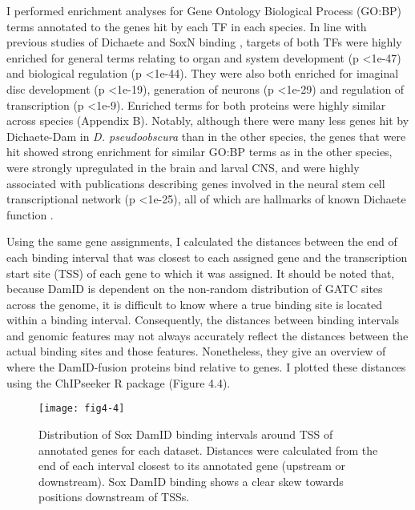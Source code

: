 I performed enrichment analyses for Gene Ontology Biological Process (GO:BP) terms annotated to the genes hit by each TF in each species. In line with previous studies of Dichaete and SoxN binding \citep{aleksic_role_2013,ferrero_soxneuro_2014}, targets of both TFs were highly enriched for general terms relating to organ and system development (p \textless 1e-47) and biological regulation (p \textless 1e-44). They were also both enriched for imaginal disc development (p \textless 1e-19), generation of neurons (p \textless 1e-29) and regulation of transcription (p \textless 1e-9). Enriched terms for both proteins were highly similar across species (Appendix B). Notably, although there were many less genes hit by Dichaete-Dam in \emph{D. pseudoobscura} than in the other species, the genes that were hit showed strong enrichment for similar GO:BP terms as in the other species, were strongly upregulated in the brain and larval CNS, and were highly associated with publications describing genes involved in the neural stem cell transcriptional network (p \textless 1e-25), all of which are hallmarks of known Dichaete function \citep{aleksic_role_2013,shen_identifying_2013,soriano_drosophila_1998}.

Using the same gene assignments, I calculated the distances between the end of each binding interval that was closest to each assigned gene and the transcription start site (TSS) of each gene to which it was assigned. It should be noted that, because DamID is dependent on the non-random distribution of GATC sites across the genome, it is difficult to know where a true binding site is located within a binding interval. Consequently, the distances between binding intervals and genomic features may not always accurately reflect the distances between the actual binding sites and those features. Nonetheless, they give an overview of where the DamID-fusion proteins bind relative to genes. I plotted these distances using the ChIPseeker R package \citep{yu_chipseeker_2014} (Figure 4.4).

\begin{figure}
\centering
\texttt{[image: fig4-4]}
\caption[Distribution of Sox DamID binding intervals around TSS of annotated genes]{Distribution of Sox DamID binding intervals around TSS of annotated genes for each dataset. Distances were calculated from the end of each interval closest to its annotated gene (upstream or downstream). Sox DamID binding shows a clear skew towards positions downstream of TSSs.}
\label{Figure 4.4}
\end{figure}

